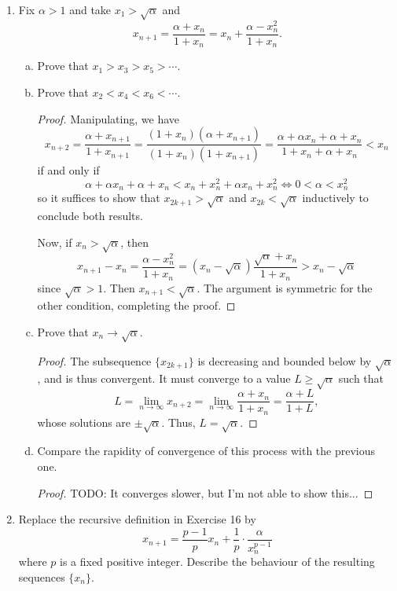 \documentclass{scrbook}
\renewcommand{\to}{\rightarrow}
\begin{document}
\begin{enumerate}
\item %
Fix $\alpha > 1$ and take $x_1 > \sqrt{\alpha}$ and
\[
	x_{n+1} = \frac{\alpha + x_n}{1 + x_n} = x_n + \frac{\alpha - x_n^2}{1 + x_n}.
\]
\begin{enumerate}[(a)]
\item Prove that $x_1 > x_3 > x_5 > \dotsb$.
\item Prove that $x_2 < x_4 < x_6 < \dotsb$.
\begin{proof}
    Manipulating, we have
    \[
        x_{n+2} = \frac{\alpha + x_{n+1}}{1 + x_{n+1}} = \frac{(1 + x_n)(\alpha + x_{n+1})}{(1 + x_n)(1 + x_{n+1})} = \frac{\alpha + \alpha x_n + \alpha + x_n}{1 + x_n + \alpha + x_n} < x_n
    \]
    if and only if
    \[
        \alpha + \alpha x_n + \alpha + x_n < x_n + x_n^2 + \alpha x_n + x_n^2 \iff 0 < \alpha < x_n^2
    \]
    so it suffices to show that $x_{2k+1} > \sqrt{\alpha}$ and $x_{2k} < \sqrt{\alpha}$ inductively to conclude both results.

    Now, if $x_n > \sqrt{\alpha}$, then 
    \[
        x_{n+1} - x_n = \frac{\alpha - x_n^2}{1 + x_n} = (x_n - \sqrt{\alpha}) \frac{\sqrt{\alpha} + x_n}{1 + x_n} > x_n - \sqrt{\alpha}
    \]
    since $\sqrt{\alpha} > 1$. Then $x_{n+1} < \sqrt{\alpha}$. The argument is symmetric for the other condition, completing the proof.
\end{proof}

\item Prove that $x_n \to \sqrt{\alpha}$.
    \begin{proof}
        The subsequence $\{x_{2k+1}\}$ is decreasing and bounded below by $\sqrt{\alpha}$, and is thus convergent. It must converge to a value $L \ge \sqrt{\alpha}$ such that
        \[
            L = \lim_{n \to \infty} x_{n+2} = \lim_{n \to \infty} \frac{\alpha + x_n}{1 + x_n} = \frac{\alpha + L}{1 + L},
        \]
        whose solutions are $\pm \sqrt{\alpha}$. Thus, $L = \sqrt{\alpha}$.
    \end{proof}
\item Compare the rapidity of convergence of this process with the previous one.

\begin{proof}
    TODO: It converges slower, but I'm not able to show this...
\end{proof}
\end{enumerate}

\item %
Replace the recursive definition in Exercise 16 by
\[
	x_{n+1} = \frac{p-1}{p} x_n + \frac{1}{p} \cdot \frac{\alpha}{x_n^{p-1}}
\]
where $p$ is a fixed positive integer. Describe the behaviour of the resulting sequences $\{x_n\}$. 


\end{enumerate}
\end{document}
